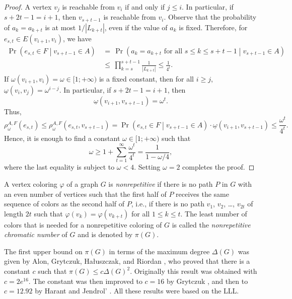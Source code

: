 \documentclass[10pt]{article}
\numberwithin{equation}{subsection}
\theoremstyle{definition}
\begin{document}
\begin{proof}
		A vertex $v_j$ is reachable from $v_i$ if and only if $j \leq i$. In particular, if $s+2t-1 = i+1$, then $v_{s+t-1}$ is reachable from $v_i$. Observe that the probability of $a_k = a_{k+t}$ is at most $1/|L_{k+t}|$, even if the value of $a_k$ is fixed. Therefore, for $e_{s, t} \in E(v_{i+1}, v_i)$, we have
		\begin{align*}
			\Pr\left(e_{s,t} \in F\middle\vert v_{s+t-1} \in A\right) \,&=\, \Pr\left(a_k = a_{k+t} \text{ for all }s\leq k \leq s+t-1 \middle\vert v_{s+t-1} \in A\right) \\
			&\leq\, \prod_{k=s}^{s+t-1} \frac{1}{|L_{k+t}|} \leq \frac{1}{4^t}.
		\end{align*}
		If $\omega(v_{i+1},v_i) = \omega \in [1; +\infty)$ is a fixed constant, then for all $i \geq j$, $\underline{\omega}(v_i, v_j) = \omega^{i-j}$.
		In particular, if $s+2t-1 = i+1$, then
		$$
			\underline{\omega}(v_{i+1}, v_{s+t-1}) = \omega^t.
		$$
		Thus,
		$$
			\rho^{A,F}_\omega(e_{s,t}) \leq \rho^{A,F}_\omega(e_{s,t}, v_{s+t-1}) = \Pr\left(e_{s,t} \in F\middle\vert v_{s+t-1} \in A\right) \cdot \underline{\omega}(v_{i+1}, v_{s+t-1})  \leq \frac{\omega^t}{4^t}.
		$$
		Hence, it is enough to find a constant $\omega \in [1; + \infty)$ such that
		$$
			\omega \geq 1 + \sum_{t=1}^\infty \frac{\omega^t}{4^t} = \frac{1}{1 -\omega/4},
		$$
		where the last equality is subject to $\omega < 4$. Setting $\omega = 2$ completes the proof. 
	\end{proof}
	
	A vertex coloring $\varphi$ of a graph $G$ is \emph{nonrepetitive} if there is no path $P$ in $G$ with an even number of vertices such that the first half of $P$ receives the same sequence of colors as the second half of $P$, i.e., if there is no path $v_1$, $v_2$, \ldots, $v_{2t}$ of length $2t$ such that $\varphi(v_k) = \varphi(v_{k+t})$ for all $1\leq k \leq t$. The least number of colors that is needed for a nonrepetitive coloring of $G$ is called the \emph{nonrepetitive chromatic number} of $G$ and is denoted by $\pi(G)$.
		
	The first upper bound on $\pi(G)$ in terms of the maximum degree $\Delta(G)$ was given by Alon, Grytczuk, Ha\l{}uszczak, and Riordan \cite{Alon3}, who proved that there is a constant $c$ such that $\pi(G)\leq c \Delta(G)^2$. Originally this result was obtained with $c = 2e^{16}$. The constant was then improved to $c = 16$ by Grytczuk \cite{Grytczuk1}, and then to $c = 12.92$ by Harant and Jendrol' \cite{Haranta}. All these results were based on the LLL.
		
\end{document}
